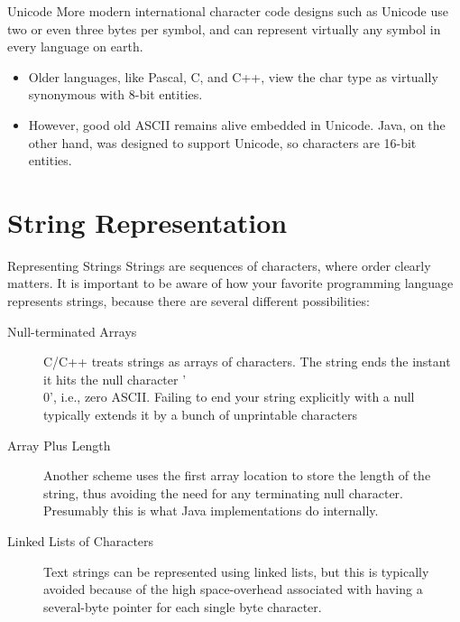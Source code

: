 \documentclass{beamer}
\begin{document}
\begin{frame}{Unicode}
  More modern international character code designs such as Unicode use two or even three bytes per symbol, and can represent virtually any symbol in every language on earth.
  \begin{itemize}
  \item Older languages, like Pascal, C, and C++, view the char type as virtually synonymous with 8-bit entities.
  \item However, good old ASCII remains alive embedded in Unicode. Java, on the other hand, was designed to support Unicode, so characters are 16-bit entities. 
  \end{itemize}


\end{frame}

\section{String Representation}


\begin{frame}{Representing Strings}
 Strings are sequences of characters, where order clearly matters.
 It is important to be aware of how your favorite programming language represents strings, because there are several different possibilities:
 \begin{description}
 \item[Null-terminated Arrays] C/C++ treats strings as arrays of characters.
  The string ends the instant it hits the null character '\\0', i.e., zero ASCII.
  Failing to end your string explicitly with a null typically extends it by a bunch of unprintable characters
 \item[Array Plus Length] Another scheme uses the first array location to store the length of the string, thus avoiding the need for any terminating null character.
  Presumably this is what Java implementations do internally.
 \item[Linked Lists of Characters] Text strings can be represented using linked lists, but this is typically avoided because of the high space-overhead associated with having a several-byte pointer for each single byte character.
 \end{description}
 

\end{frame}
\end{document}
